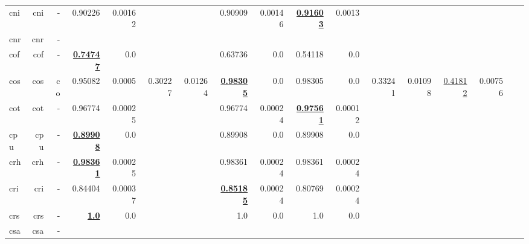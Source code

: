 \documentclass[11pt]{article}
\begin{document}
\begin{table*}[h]
{\begin{tabular}{lrrrrrrrrrrrrrrrr}
cni         & cni         & -         & 0.90226         & 0.00162         &          &          & 0.90909         & 0.00146         & \textbf{\underline{0.91603}}         & 0.0013         &          &          &          &          \\
cnr         & cnr         & -         &          &          &          &          &          &          &          &          &          &          &          &          \\
cof         & cof         & -         & \textbf{\underline{0.74747}}         & 0.0         &          &          & 0.63736         & 0.0         & 0.54118         & 0.0         &          &          &          &          \\
cos         & cos         & co         & 0.95082         & 0.0005         & 0.30227         & 0.01264         & \textbf{\underline{0.98305}}         & 0.0         & 0.98305         & 0.0         & 0.33241         & 0.01098         & \underline{0.41812}         & 0.00756         \\
cot         & cot         & -         & 0.96774         & 0.00025         &          &          & 0.96774         & 0.00024         & \textbf{\underline{0.97561}}         & 0.00012         &          &          &          &          \\
cpu         & cpu         & -         & \textbf{\underline{0.89908}}         & 0.0         &          &          & 0.89908         & 0.0         & 0.89908         & 0.0         &          &          &          &          \\
crh         & crh         & -         & \textbf{\underline{0.98361}}         & 0.00025         &          &          & 0.98361         & 0.00024         & 0.98361         & 0.00024         &          &          &          &          \\
cri         & cri         & -         & 0.84404         & 0.00037         &          &          & \textbf{\underline{0.85185}}         & 0.00024         & 0.80769         & 0.00024         &          &          &          &          \\
crs         & crs         & -         & \textbf{\underline{1.0}}         & 0.0         &          &          & 1.0         & 0.0         & 1.0         & 0.0         &          &          &          &          \\
csa         & csa         & -         &          &          &          &          &          &          &          &          &          &          &          &          \\

\end{tabular}}
\end{table*}
\end{document}
